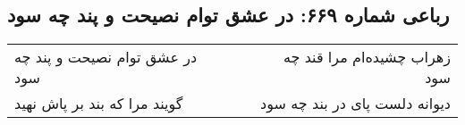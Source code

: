 \begin{center}
\section*{رباعی شماره ۶۶۹: در عشق توام نصیحت و پند چه سود}
\label{sec:0669}
\begin{longtable}{l p{0.5cm} r}
در عشق توام نصیحت و پند چه سود
&&
زهراب چشیده‌ام مرا قند چه سود
\\
گویند مرا که بند بر پاش نهید
&&
دیوانه دلست پای در بند چه سود
\\
\end{longtable}
\end{center}
